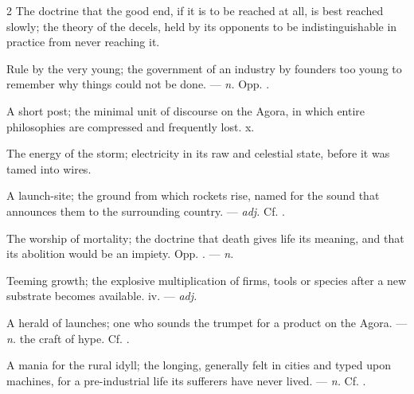 \begin{multicols}{2}
 The doctrine that the good end, if it is to be reached at all, is best reached slowly; the theory of the decels, held by its opponents to be indistinguishable in practice from never reaching it.

  Rule by the very young; the government of an industry by founders too young to remember why things could not be done.  —  \textit{n.} Opp. .

 A short post; the minimal unit of discourse on the Agora, in which entire philosophies are compressed and frequently lost.   x.

 The energy of the storm; electricity in its raw and celestial state, before it was tamed into wires.  

 A launch-site; the ground from which rockets rise, named for the sound that announces them to the surrounding country. —  \textit{adj.} Cf. .

 The worship of mortality; the doctrine that death gives life its meaning, and that its abolition would be an impiety. Opp. . —  \textit{n.}

 Teeming growth; the explosive multiplication of firms, tools or species after a new substrate becomes available.   iv. —  \textit{adj.}

 A herald of launches; one who sounds the trumpet for a product on the Agora. —  \textit{n.} the craft of hype. Cf. .

 A mania for the rural idyll; the longing, generally felt in cities and typed upon machines, for a pre-industrial life its sufferers have never lived. —  \textit{n.} Cf. .

\end{multicols}

